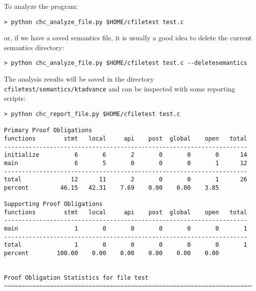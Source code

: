 \documentclass[11pt]{article}
\begin{document}
To analyze the program:
\begin{verbatim}
> python chc_analyze_file.py $HOME/cfiletest test.c 
\end{verbatim}
or, if we have a saved semantics file, it is usually a good idea to delete the
current semantics directory:
\begin{verbatim}
> python chc_analyze_file.py $HOME/cfiletest test.c --deletesemantics
\end{verbatim}
The analysis results will be saved in the directory {\tt cfiletest/semantics/ktadvance} and
can be inspected with some reporting scripts:
\begin{small}
\begin{verbatim}
> python chc_report_file.py $HOME/cfiletest test.c

Primary Proof Obligations
functions        stmt   local     api    post  global    open   total
---------------------------------------------------------------------
initialize          6       6       2       0       0       0      14
main                6       5       0       0       0       1      12
---------------------------------------------------------------------
total              12      11       2       0       0       1      26
percent         46.15   42.31    7.69    0.00    0.00    3.85

Supporting Proof Obligations
functions        stmt   local     api    post  global    open   total
---------------------------------------------------------------------
main                1       0       0       0       0       0       1
---------------------------------------------------------------------
total               1       0       0       0       0       0       1
percent        100.00    0.00    0.00    0.00    0.00    0.00


Proof Obligation Statistics for file test
~~~~~~~~~~~~~~~~~~~~~~~~~~~~~~~~~~~~~~~~~~~~~~~~~~~~~~~~~~~~~~~~~~~~~~~~~~~~~~~~


\end{verbatim}
\end{small}
\end{document}
